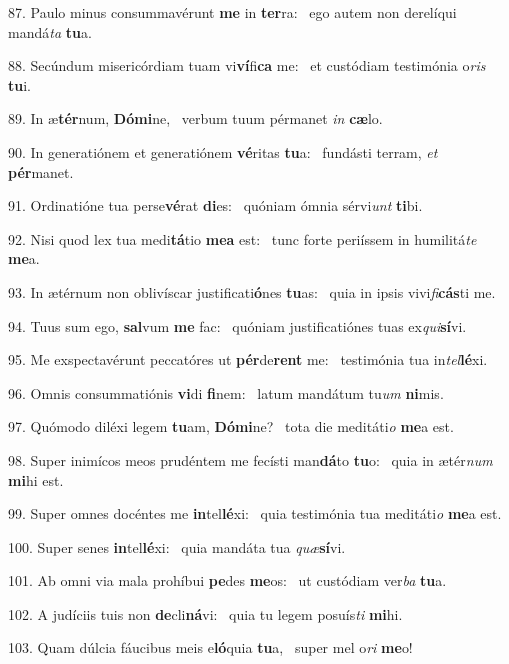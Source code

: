 87. Paulo minus consummavérunt \textbf{me} in \textbf{ter}ra: \ast\  ego autem non derelíqui mandá\textit{ta} \textbf{tu}a.\

88. Secúndum misericórdiam tuam vi\textbf{ví}fi\textbf{ca} me: \ast\  et custódiam testimónia o\textit{ris} \textbf{tu}i.\

89. In æ\textbf{tér}num, \textbf{Dó}\textbf{mi}ne, \ast\  verbum tuum pérmanet \textit{in} \textbf{cæ}lo.\

90. In generatiónem et generatiónem \textbf{vé}ritas \textbf{tu}a: \ast\  fundásti terram, \textit{et} \textbf{pér}manet.\

91. Ordinatióne tua perse\textbf{vé}rat \textbf{di}es: \ast\  quóniam ómnia sérvi\textit{unt} \textbf{ti}bi.\

92. Nisi quod lex tua medi\textbf{tá}tio \textbf{me}\textbf{a} est: \ast\  tunc forte periíssem in humilitá\textit{te} \textbf{me}a.\

93. In ætérnum non oblivíscar justificati\textbf{ó}nes \textbf{tu}as: \ast\  quia in ipsis vivi\textit{fi}\textbf{cás}ti me.\

94. Tuus sum ego, \textbf{sal}vum \textbf{me} fac: \ast\  quóniam justificatiónes tuas ex\textit{qui}\textbf{sí}vi.\

95. Me exspectavérunt peccatóres ut \textbf{pér}de\textbf{rent} me: \ast\  testimónia tua in\textit{tel}\textbf{lé}xi.\

96. Omnis consummatiónis \textbf{vi}di \textbf{fi}nem: \ast\  latum mandátum tu\textit{um} \textbf{ni}mis.\

97. Quómodo diléxi legem \textbf{tu}am, \textbf{Dó}\textbf{mi}ne? \ast\  tota die meditáti\textit{o} \textbf{me}a est.\

98. Super inimícos meos prudéntem me fecísti man\textbf{dá}to \textbf{tu}o: \ast\  quia in ætér\textit{num} \textbf{mi}hi est.\

99. Super omnes docéntes me \textbf{in}tel\textbf{lé}xi: \ast\  quia testimónia tua meditáti\textit{o} \textbf{me}a est.\

100. Super senes \textbf{in}tel\textbf{lé}xi: \ast\  quia mandáta tua \textit{quæ}\textbf{sí}vi.\

101. Ab omni via mala prohíbui \textbf{pe}des \textbf{me}os: \ast\  ut custódiam ver\textit{ba} \textbf{tu}a.\

102. A judíciis tuis non \textbf{de}cli\textbf{ná}vi: \ast\  quia tu legem posuís\textit{ti} \textbf{mi}hi.\

103. Quam dúlcia fáucibus meis e\textbf{ló}quia \textbf{tu}a, \ast\  super mel o\textit{ri} \textbf{me}o!\


